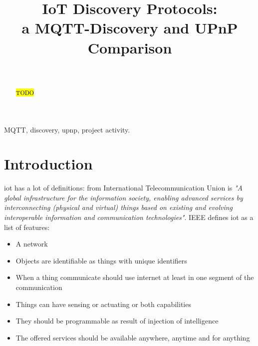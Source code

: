\documentclass[lettersize,journal]{IEEEtran}
\begin{document}
\title{IoT Discovery Protocols:\\a MQTT-Discovery and UPnP Comparison}

\author{ \\
}


\maketitle

\begin{abstract}
\textcolor{blue}{\hl{TODO}}
\end{abstract}

\begin{IEEEkeywords}
MQTT, discovery, upnp, project activity.
\end{IEEEkeywords}

\section{Introduction}

\gls{iot} has a lot of definitions: from International Telecommunication Union is \textit{"A global infrastructure for the information society, enabling advanced services by interconnecting (physical and virtual) things based on existing and evolving interoperable information and communication technologies"}. IEEE defines \gls{iot} as a list of features:

\begin{itemize}
    \item A network
    \item Objects are identifiable as things with unique identifiers
    \item When a thing communicate should use internet at least in one segment of the communication
    \item Things can have sensing or actuating or both capabilities
    \item They should be programmable as result of injection of intelligence
    \item The offered services should be available anywhere, anytime and for anything
\end{itemize}
\end{document}
